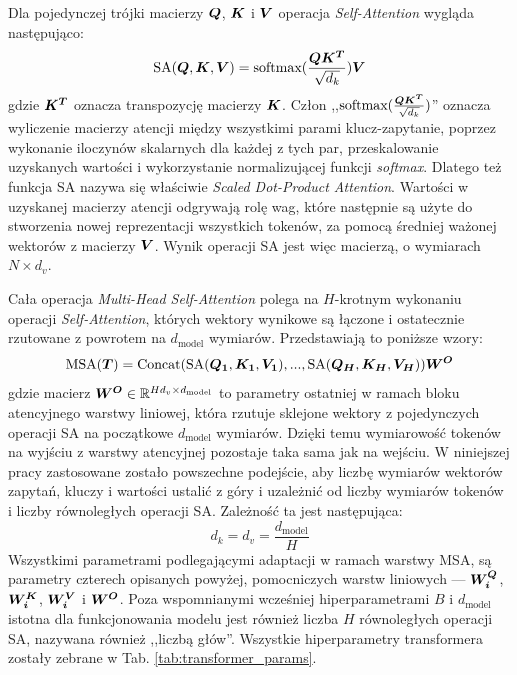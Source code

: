 Dla pojedynczej trójki macierzy $\boldsymbol{Q}$, $\boldsymbol{K}$ i $\boldsymbol{V}$ operacja \emph{Self-Attention} wygląda następująco:
\begin{equation} \label{eq:sa}
    \textrm{SA}(\boldsymbol{Q}, \boldsymbol{K}, \boldsymbol{V}) = \textrm{softmax}(\frac{\boldsymbol{Q}\boldsymbol{K^T}}{\sqrt{d_k}})\boldsymbol{V}
\end{equation}
gdzie $\boldsymbol{K^T}$ oznacza transpozycję macierzy $\boldsymbol{K}$. Człon ,,$\textrm{softmax}(\frac{\boldsymbol{Q}\boldsymbol{K^T}}{\sqrt{d_k}})$'' oznacza wyliczenie macierzy atencji między wszystkimi parami klucz-zapytanie, poprzez wykonanie iloczynów skalarnych dla każdej z tych par, przeskalowanie uzyskanych wartości i wykorzystanie normalizującej funkcji \emph{softmax}. Dlatego też funkcja SA nazywa się właściwie \emph{Scaled Dot-Product Attention}.  Wartości w uzyskanej macierzy atencji odgrywają rolę wag, które następnie są użyte do stworzenia nowej reprezentacji wszystkich tokenów, za pomocą średniej ważonej wektorów z macierzy $\boldsymbol{V}$.  Wynik operacji SA jest więc macierzą, o wymiarach $N \times d_v$.

Cała operacja \emph{Multi-Head Self-Attention} polega na $H$-krotnym wykonaniu operacji \emph{Self-Attention}, których wektory wynikowe są łączone i ostatecznie rzutowane z powrotem na $d_{\mathrm{model}}$ wymiarów. Przedstawiają to poniższe wzory:
\begin{equation}
    \textrm{MSA}(\boldsymbol{T}) = \textrm{Concat}(\textrm{SA}(\boldsymbol{Q_1}, \boldsymbol{K_1}, \boldsymbol{V_1}), ..., \textrm{SA}(\boldsymbol{Q_H},
    \boldsymbol{K_H}, \boldsymbol{V_H}))\boldsymbol{W^O}
\end{equation}
gdzie macierz $\boldsymbol{W^O} \in \mathbb{R}^{Hd_v \times d_{\mathrm{model}}}$ to parametry ostatniej w ramach bloku atencyjnego warstwy liniowej, która rzutuje sklejone wektory z pojedynczych operacji SA na początkowe $d_{\mathrm{model}}$ wymiarów. Dzięki temu wymiarowość tokenów na wyjściu z warstwy atencyjnej pozostaje taka sama jak na wejściu. W niniejszej pracy zastosowane zostało powszechne podejście, aby liczbę wymiarów wektorów zapytań, kluczy i wartości ustalić z góry i uzależnić od liczby wymiarów tokenów i liczby równoległych operacji SA. Zależność ta jest następująca:
\begin{equation}
    d_k = d_v = \frac{d_{\mathrm{model}}}{H}
\end{equation}
Wszystkimi parametrami podlegającymi adaptacji w ramach warstwy MSA, są parametry czterech opisanych powyżej, pomocniczych warstw liniowych --- $\boldsymbol{W_i^Q}$, $\boldsymbol{W_i^K}$, $\boldsymbol{W_i^V}$ i $\boldsymbol{W^O}$. Poza wspomnianymi wcześniej hiperparametrami $B$ i $d_{\mathrm{model}}$ istotna dla funkcjonowania modelu jest również liczba $H$ równoległych operacji SA, nazywana również ,,liczbą głów''. Wszystkie hiperparametry transformera zostały zebrane w Tab. \ref{tab:transformer_params}.

